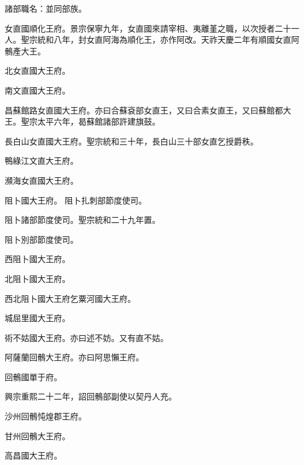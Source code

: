 \begin{pinyinscope}
 諸部職名：並同部族。



 女直國順化王府。景宗保寧九年，女直國來請宰相、夷離堇之職，以次授者二十一人。聖宗統和八年，封女直阿海為順化王，亦作阿改。天祚天慶二年有順國女直阿鶻產大王。



 北女直國大王府。



 南文直國大王府。



 昌蘇館路女直國大王府。亦曰合蘇袞部女直王，又曰合素女直王，又曰蘇館都大王。聖宗太平六年，曷蘇館諸部許建旗鼓。



 長白山女直國大王府。聖宗統和三十年，長白山三十部女直乞授爵秩。



 鴨綠江文直大王府。



 瀕海女直國大王府。



 阻卜國大王府。
 阻卜扎刺部節度使司。



 阻卜諸部節度使司。聖宗統和二十九年置。



 阻卜別部節度使司。



 西阻卜國大王府。



 北阻卜國大王府。



 西北阻卜國大王府乞粟河國大王府。



 城屈里國大王府。



 術不姑國大王府。亦曰述不妨。又有直不姑。



 阿薩蘭回鶻大王府。亦曰阿思懶王府。



 回鶻國單于府。



 興宗重熙二十二年，詔回鶻部副使以契丹人充。



 沙州回鶻忳煌郡王府。



 甘州回鶻大王府。



 高昌國大王府。




\end{pinyinscope}
